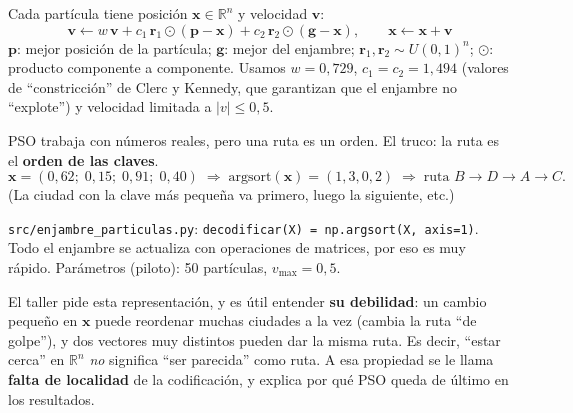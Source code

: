 \documentclass[11pt,a4paper]{article}
\newcommand{\archivo}[1]{\texttt{#1}}
\begin{document}
\begin{mate}
Cada partícula tiene posición $\mathbf{x}\in\mathbb{R}^n$ y velocidad $\mathbf{v}$:
\[
\mathbf{v}\leftarrow w\,\mathbf{v}+c_1\,\mathbf{r}_1\odot(\mathbf{p}-\mathbf{x})+c_2\,\mathbf{r}_2\odot(\mathbf{g}-\mathbf{x}),
\qquad \mathbf{x}\leftarrow\mathbf{x}+\mathbf{v}
\]
$\mathbf{p}$: mejor posición de la partícula; $\mathbf{g}$: mejor del enjambre; $\mathbf{r}_1,\mathbf{r}_2\sim U(0,1)^n$;
$\odot$: producto componente a componente. Usamos $w=0{,}729$, $c_1=c_2=1{,}494$ (valores de ``constricción'' de Clerc y Kennedy,
que garantizan que el enjambre no ``explote'') y velocidad limitada a $|v|\le0{,}5$.
\end{mate}

\begin{mate}
PSO trabaja con números reales, pero una ruta es un orden. El truco: la ruta es el \textbf{orden de las claves}.
\[
\mathbf{x}=(0{,}62;\;0{,}15;\;0{,}91;\;0{,}40)\;\Rightarrow\;\text{argsort}(\mathbf{x})=(1,3,0,2)\;\Rightarrow\;\text{ruta } B\to D\to A\to C.
\]
(La ciudad con la clave más pequeña va primero, luego la siguiente, etc.)
\end{mate}

\begin{codigo}
\archivo{src/enjambre\_particulas.py}: \texttt{decodificar(X) = np.argsort(X, axis=1)}. Todo el enjambre se actualiza con operaciones
de matrices, por eso es muy rápido. Parámetros (piloto): 50 partículas, $v_{\max}=0{,}5$.
\end{codigo}

\begin{porque}
El taller pide esta representación, y es útil entender \textbf{su debilidad}: un cambio pequeño en $\mathbf{x}$ puede reordenar muchas ciudades
a la vez (cambia la ruta ``de golpe''), y dos vectores muy distintos pueden dar la misma ruta. Es decir, ``estar cerca'' en $\mathbb{R}^n$
\emph{no} significa ``ser parecida'' como ruta. A esa propiedad se le llama \textbf{falta de localidad} de la codificación, y explica
por qué PSO queda de último en los resultados.
\end{porque}

\end{document}
